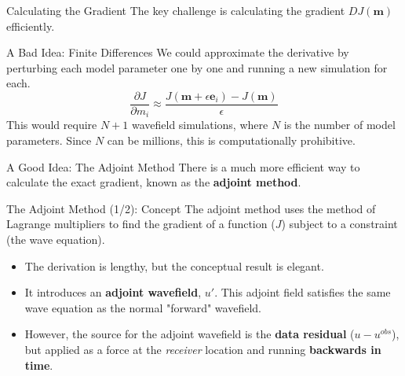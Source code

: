 \documentclass{beamer}
\begin{document}
\begin{frame}{Calculating the Gradient}
    The key challenge is calculating the gradient $DJ(\mathbf{m})$ efficiently.
    \begin{block}{A Bad Idea: Finite Differences}
        We could approximate the derivative by perturbing each model parameter one by one and running a new simulation for each.
        $$ \frac{\partial J}{\partial m_i} \approx \frac{J(\mathbf{m} + \epsilon \mathbf{e}_i) - J(\mathbf{m})}{\epsilon} $$
        This would require $N+1$ wavefield simulations, where $N$ is the number of model parameters. Since $N$ can be millions, this is computationally prohibitive.
    \end{block}
    \pause
    \begin{alertblock}{A Good Idea: The Adjoint Method}
        There is a much more efficient way to calculate the exact gradient, known as the \textbf{adjoint method}.
    \end{alertblock}
\end{frame}

\begin{frame}{The Adjoint Method (1/2): Concept}
    The adjoint method uses the method of Lagrange multipliers to find the gradient of a function ($J$) subject to a constraint (the wave equation).
    \begin{itemize}
        \item The derivation is lengthy, but the conceptual result is elegant.
        \pause
        \item It introduces an \textbf{adjoint wavefield}, $u'$. This adjoint field satisfies the same wave equation as the normal "forward" wavefield.
        \pause
        \item However, the source for the adjoint wavefield is the \textbf{data residual} ($u - u^{obs}$), but applied as a force at the \textit{receiver} location and running \textbf{backwards in time}.
    \end{itemize}
\end{frame}
\end{document}
